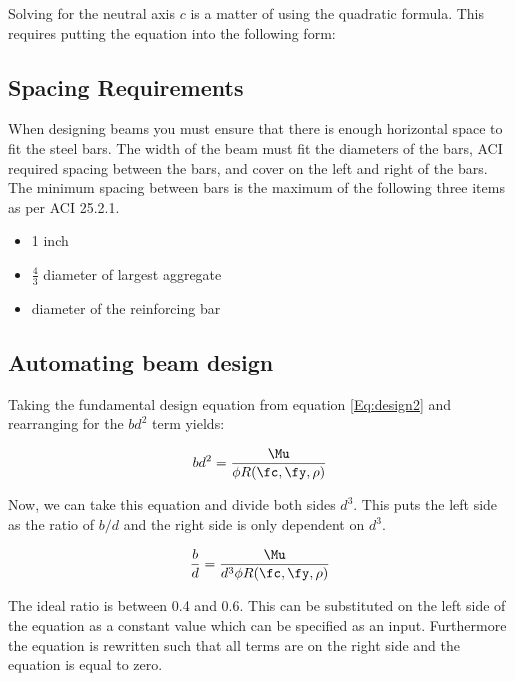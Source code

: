 Solving for the neutral axis $c$ is a matter of using the quadratic formula. This requires putting the equation into the following form:


\subsection{Spacing Requirements}
When designing beams you must ensure that there is enough horizontal space to fit the steel bars. The width of the beam must fit the diameters of the bars, ACI required spacing between the bars, and cover on the left and right of the bars. The minimum spacing between bars is the maximum of the following three items as per ACI 25.2.1.

\begin{itemize}
	\item 1 inch
	\item $\frac{4}{3}$ diameter of largest aggregate
	\item diameter of the reinforcing bar
\end{itemize}



\subsection{Automating beam design}


Taking the fundamental design equation from equation \ref{Eq:design2} and rearranging for the $bd^2$ term yields:

\begin{align}
	bd^2=\frac{\Mu}{\phi R(\fc,\fy,\rho)}
\end{align}

Now, we can take this equation and divide both sides $d^3$. This puts the left side as the ratio of $b/d$ and the right side is only dependent on $d^3$.

\begin{align}
	\frac{b}{d}=\frac{\Mu}{d^3 \phi R(\fc,\fy,\rho)}
\end{align}

The ideal ratio is between 0.4 and 0.6. This can be substituted on the left side of the equation as a constant value which can be specified as an input. Furthermore the equation is rewritten such that all terms are on the right side and the equation is equal to zero.



